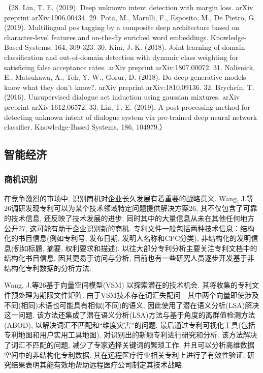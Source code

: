 \documentclass{Style/aas}
\begin{document}
\begin{multicols}{2}
  （28.	Lin, T. E. (2019). Deep unknown intent detection with margin loss. arXiv preprint arXiv:1906.00434.
  29.	Pota, M., Marulli, F., Esposito, M., De Pietro, G. (2019). Multilingual pos tagging by a composite deep architecture based on character-level features and on-the-fly enriched word embeddings. Knowledge-Based Systems, 164, 309-323.
  30.	Kim, J. K. (2018). Joint learning of domain classification and out-of-domain detection with dynamic class weighting for satisficing false acceptance rates. arXiv preprint arXiv:1807.00072.
  31.	Nalisnick, E., Matsukawa, A., Teh, Y. W., Gorur, D. (2018). Do deep generative models know what they don't know?. arXiv preprint arXiv:1810.09136.
  32.	Brychcín, T. (2016). Unsupervised dialogue act induction using gaussian mixtures. arXiv preprint arXiv:1612.06572.
  33.	Lin, T. E. (2019). A post-processing method for detecting unknown intent of dialogue system via pre-trained deep neural network classifier. Knowledge-Based Systems, 186, 104979.）
  
  \subsection{智能经济}
  \subsubsection{商机识别}
  在竞争激烈的市场中, 识别商机对企业长久发展有着重要的战略意义. Wang, J.等26调研发现专利可以为某个技术领域特定问题提供解决方案26, 其不仅包含了可靠的技术信息, 还反映了技术发展的进步, 同时其中的大量信息从未在其他任何地方公开27, 这可能有助于企业识别新的商机. 专利文件一般包括两种技术信息：结构化的书目信息(例如专利号, 发布日期, 发明人名称和CPC分类), 非结构化的发明信息(例如标题, 摘要, 权利要求和描述). 以往大部分专利分析主要关注专利文档中的结构化书目信息, 因其更易于访问与分析, 目前也有一些研究人员逐步开发基于非结构化专利数据的分析方法. 

  Wang, J.等26基于向量空间模型(VSM) 以探索潜在的技术机会. 其将收集的专利文件预处理为期限文件矩阵. 由于VSM技术存在词汇失配问—其中两个向量即使涉及不同(相同)术语也可能具有相似(不同)的语义, 因此使用了潜在语义分析(LSA)解决这一问题. 该方法还集成了潜在语义分析(LSA)方法与基于角度的离群值检测方法(ABOD), 以解决词汇不匹配和“维度灾害”的问题. 最后通过专利可视化工具(包括专利地图和用户实用工具地图), 对识别出的新颖专利进行研究和分析. 该方法解决了词汇不匹配的问题, 减少了专家选择关键词的繁琐工作, 并且可以分析高维数据空间中的非结构化专利数据. 其在远程医疗行业相关专利上进行了有效性验证, 研究结果表明其能有效地帮助远程医疗公司制定其技术战略. 


\end{multicols}
\end{document}
